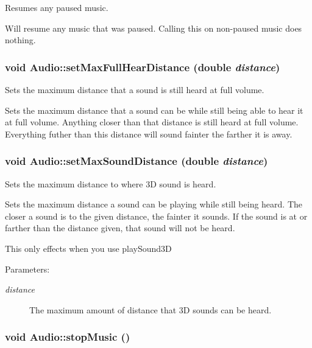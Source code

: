 Resumes any paused music. 

Will resume any music that was paused. Calling this on non-paused music does nothing. \hypertarget{class_audio_dad7a00ceb96ae0771e9565ec5782f94}{
\subsubsection[{setMaxFullHearDistance}]{\setlength{\rightskip}{0pt plus 5cm}void Audio::setMaxFullHearDistance (double {\em distance})}}
\label{class_audio_dad7a00ceb96ae0771e9565ec5782f94}


Sets the maximum distance that a sound is still heard at full volume. 

Sets the maximum distance that a sound can be while still being able to hear it at full volume. Anything closer than that distance is still heard at full volume. Everything futher than this distance will sound fainter the farther it is away. \hypertarget{class_audio_5d139a257adfe6cfe3b3aace9b9c4259}{
\subsubsection[{setMaxSoundDistance}]{\setlength{\rightskip}{0pt plus 5cm}void Audio::setMaxSoundDistance (double {\em distance})}}
\label{class_audio_5d139a257adfe6cfe3b3aace9b9c4259}


Sets the maximum distance to where 3D sound is heard. 

Sets the maximum distance a sound can be playing while still being heard. The closer a sound is to the given distance, the fainter it sounds. If the sound is at or farther than the distance given, that sound will not be heard.

This only effects when you use playSound3D \begin{Desc}
\item[Parameters:]
\begin{description}
\item[{\em distance}]The maximum amount of distance that 3D sounds can be heard. \end{description}
\end{Desc}
\hypertarget{class_audio_1429d9251b77a334ac9ecb071d0936f5}{
\subsubsection[{stopMusic}]{\setlength{\rightskip}{0pt plus 5cm}void Audio::stopMusic ()}}
\label{class_audio_1429d9251b77a334ac9ecb071d0936f5}


